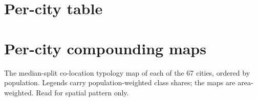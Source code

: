 \documentclass[11pt]{article}
\begin{document}
\clearpage
\section{Per-city table}\label{si:cities}


\clearpage
\section{Per-city compounding maps}\label{si:gallery}
The median-split co-location typology map of each of the 67 cities,
ordered by population. Legends carry population-weighted class shares;
the maps are area-weighted. Read for spatial pattern only.





\end{document}
